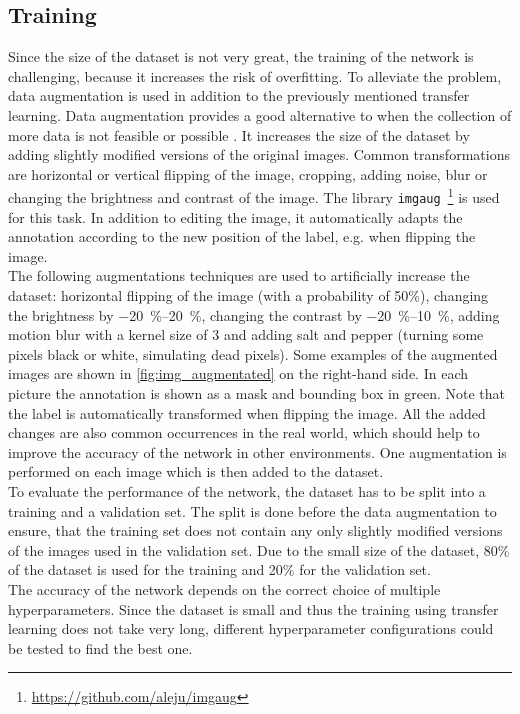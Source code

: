 \subsection{Training}
\label{ssec:training}
Since the size of the dataset is not very great, the training of the network is challenging, because it increases the risk of overfitting.
To alleviate the problem, data augmentation is used in addition to the previously mentioned transfer learning.
Data augmentation provides a good alternative to when the collection of more data is not feasible or possible \cite{Shorten2019}.
It increases the size of the dataset by adding slightly modified versions of the original images.
Common transformations are horizontal or vertical flipping of the image, cropping, adding noise, blur or changing the brightness and contrast of the image.
The library \texttt{imgaug}~\footnote{\url{https://github.com/aleju/imgaug}} \cite{Jung2018} is used for this task.
In addition to editing the image, it automatically adapts the annotation according to the new position of the label, e.g. when flipping the image.\\
The following augmentations techniques are used to artificially increase the dataset: horizontal flipping of the image (with a probability of 50\%), changing the brightness by \SIrange{-20}{20}{\percent}, changing the contrast by \SIrange{-20}{10}{\percent}, adding motion blur with a kernel size of 3 and adding salt and pepper (turning some pixels black or white, simulating dead pixels).
Some examples of the augmented images are shown in \cref{fig:img_augmentated} on the right-hand side.
In each picture the annotation is shown as a mask and bounding box in green.
Note that the label is automatically transformed when flipping the image.
All the added changes are also common occurrences in the real world, which should help to improve the accuracy of the network in other environments.
One augmentation is performed on each image which is then added to the dataset.\\
To evaluate the performance of the network, the dataset has to be split into a training and a validation set.
The split is done before the data augmentation to ensure, that the training set does not contain any only slightly modified versions of the images used in the validation set.
Due to the small size of the dataset, 80\% of the dataset is used for the training and 20\% for the validation set.\\
The accuracy of the network depends on the correct choice of multiple hyperparameters.
Since the dataset is small and thus the training using transfer learning does not take very long, different hyperparameter configurations could be tested to find the best one.
